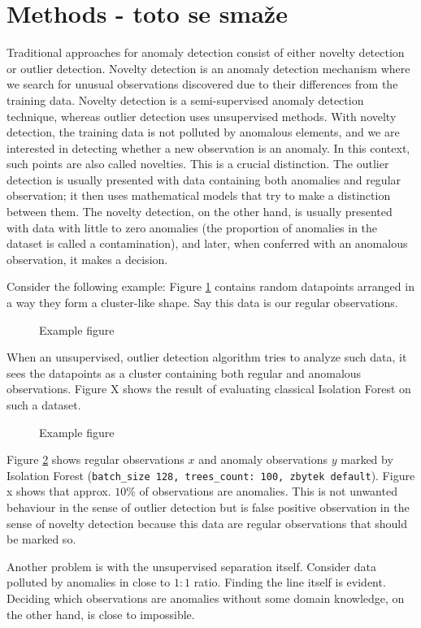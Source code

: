 \section{Methods - toto se smaže}
\label{sec:methods}
Traditional approaches for anomaly detection consist of either novelty
detection or outlier detection. Novelty detection is an anomaly
detection mechanism where we search for unusual observations 
discovered due to their differences from the training data. Novelty
detection is a semi-supervised anomaly detection technique, whereas
outlier detection uses unsupervised methods. With novelty detection, the
training data is not polluted by anomalous elements, and we are
interested in detecting whether a new observation is an anomaly. In this context, such points are also called novelties. This is a crucial
distinction. The outlier detection is usually presented with data
containing both anomalies and regular observation; it then uses
mathematical models that try to make a distinction between them. The
novelty detection, on the other hand, is usually presented with data with
little to zero anomalies (the proportion of anomalies in the dataset is
called a contamination), and later, when conferred with an anomalous
observation, it makes a decision.

Consider the following example: Figure \ref{fig:example0} contains random datapoints
arranged in a way they form a cluster-like shape. Say this data is our
regular observations.

\begin{figure}[htbp]
\centering

\caption{Example figure}
\label{fig:example0}
\end{figure}

When an unsupervised, outlier detection algorithm tries to analyze such
data, it sees the datapoints as a cluster containing both regular and
anomalous observations. Figure X shows the result of evaluating
classical Isolation Forest on such a dataset.

\begin{figure}[htbp]
\centering

\caption{Example figure}
\label{fig:example05}
\end{figure}

Figure \ref{fig:example05} shows regular observations \(x\) and anomaly observations \(y\)
marked by Isolation Forest
(\texttt{batch\_size\ 128,\ trees\_count:\ 100,\ zbytek\ default}).
Figure x shows that approx. \(10\%\) of observations are anomalies. This
is not unwanted behaviour in the sense of outlier detection but is false
positive observation in the sense of novelty detection because this
data are regular observations that should be marked so.

Another problem is with the unsupervised separation itself. Consider data polluted by anomalies in close to \(1:1\) ratio. Finding the line
itself is evident. Deciding which observations are anomalies without some domain knowledge, on the other hand, is close to impossible.